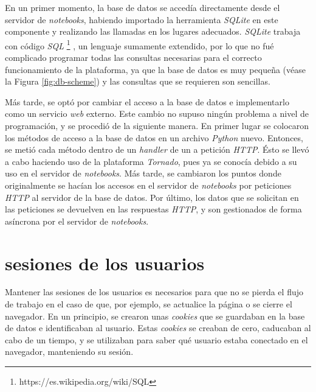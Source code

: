 \documentclass[11pt,spanish,listoffigures]{tfgetsinf}
\begin{document}
En un primer momento, la base de datos se accedía directamente desde el servidor de \textit{notebooks}, habiendo importado la herramienta \textit{SQLite} en este componente y realizando las llamadas en los lugares adecuados. \textit{SQLite} trabaja con código \textit{SQL} \footnote{https://es.wikipedia.org/wiki/SQL} , un lenguaje sumamente extendido,  por lo que no fué complicado programar todas las consultas necesarias para el correcto funcionamiento de la plataforma, ya que la base de datos es muy pequeña (véase la Figura \ref{fig:db-scheme}) y las consultas que se requieren son sencillas.

Más tarde, se optó por cambiar el acceso a la base de datos e implementarlo como un servicio \textit{web} externo. Este cambio no supuso ningún problema a nivel de programación, y se procedió de la siguiente manera. En primer lugar se colocaron los métodos de acceso a la base de datos en un archivo \textit{Python} nuevo. Entonces, se metió cada método dentro de un \textit{handler} de un a petición \textit{HTTP}. Ésto se llevó a cabo haciendo uso de la plataforma \textit{Tornado}, pues ya se conocía debido a su uso en el servidor de \textit{notebooks}. Más tarde, se cambiaron los puntos donde originalmente se hacían los accesos en el servidor de \textit{notebooks} por peticiones \textit{HTTP} al servidor de la base de datos. Por último, los datos que se solicitan en las peticiones se devuelven en las respuestas \textit{HTTP}, y son gestionados de forma asíncrona por el servidor de \textit{notebooks}.



\section{sesiones de los usuarios}
\label{sec:desarrollo-sesiones}

Mantener las sesiones de los usuarios es necesarios para que no se pierda el flujo de trabajo en el caso de que, por ejemplo, se actualice la página o se cierre el navegador. En un principio, se crearon unas \textit{cookies} que se guardaban en la base de datos e identificaban al usuario. Estas \textit{cookies} se creaban de cero,  caducaban al cabo de un tiempo, y se utilizaban para saber qué usuario estaba conectado en el navegador, manteniendo su sesión. 
\end{document}
